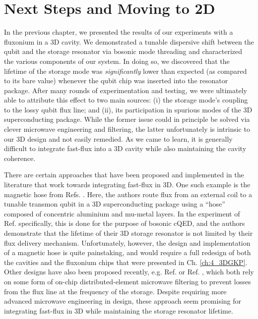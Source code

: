 \chapter{Next Steps and Moving to 2D\label{ch:5_2DGKP}}


In the previous chapter, we presented the results of our experiments with a fluxonium in a 3D cavity. We demonstrated a tunable dispersive shift between the qubit and the storage resonator via bosonic mode threading and characterized the various components of our system. In doing so, we discovered that the lifetime of the storage mode was \textit{significantly} lower than expected (as compared to its bare value) whenever the qubit chip was inserted into the resonator package. After many rounds of experimentation and testing, we were ultimately able to attribute this effect to two main sources: (i) the storage mode's coupling to the lossy qubit flux line; and (ii), its participation in spurious modes of the 3D superconducting package. While the former issue could in principle be solved via clever microwave engineering and filtering, the latter unfortunately is intrinsic to our 3D design and not easily remedied. As we came to learn, it is generally difficult to integrate fast-flux into a 3D cavity while also maintaining the cavity coherence. 

There are certain approaches that have been proposed and implemented in the literature that work towards integrating fast-flux in 3D. One such example is the magnetic hose from Refs. \cite{gargiulo2021fast,valadares2023demand}. Here, the authors route flux from an external coil to a tunable transmon qubit in a 3D superconducting package using a ``hose'' composed of concentric aluminium and mu-metal layers. In the experiment of Ref. \cite{valadares2023demand} specifically, this is done for the purpose of bosonic cQED, and the authors demonstrate that the lifetime of their 3D storage resonator is not limited by their flux delivery mechanism. Unfortunately, however, the design and implementation of a magnetic hose is quite painstaking, and would require a full redesign of both the cavities and the fluxonium chips that were presented in Ch. \ref{ch:4_3DGKP}. Other designs have also been proposed recently, e.g. Ref. \cite{hutin2024monitoring} or Ref. \cite{maiti2024ancilla}, which both rely on some form of on-chip distributed-element microwave filtering to prevent losses from the flux line at the frequency of the storage. Despite requiring more advanced microwave engineering in design, these approach seem promising for integrating fast-flux in 3D while maintaining the storage resonator lifetime. 

